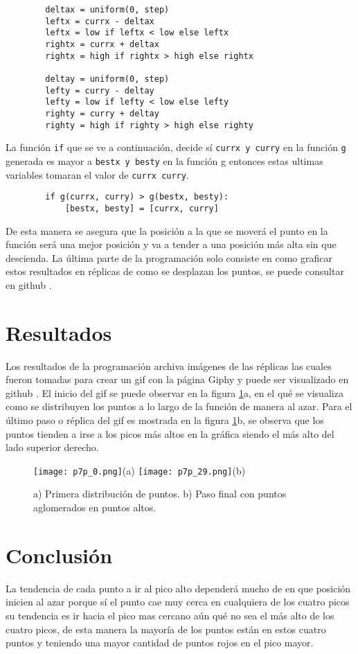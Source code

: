 \documentclass[a4paper, 11pt]{article}
\begin{document}
\begin{verbatim}
        deltax = uniform(0, step)
        leftx = currx - deltax  
        leftx = low if leftx < low else leftx  
        rightx = currx + deltax 
        rightx = high if rightx > high else rightx
        
        deltay = uniform(0, step)
        lefty = curry - deltay  
        lefty = low if lefty < low else lefty  
        righty = curry + deltay  
        righty = high if righty > high else righty 
\end{verbatim}

La función \texttt{if} que se ve a continuación, decide sí \texttt{currx y curry} en la función \texttt{g} generada es mayor a \texttt{bestx y besty} en la función g entonces estas ultimas variables tomaran el valor de \texttt{currx curry}.

\begin{verbatim}
        if g(currx, curry) > g(bestx, besty):
            [bestx, besty] = [currx, curry]
\end{verbatim}
De esta manera se asegura que la posición a la que se moverá el punto en la función será una mejor posición y va a tender a una posición más alta sin que descienda.
La última parte de la programación solo consiste en como graficar estos resultados en réplicas de como se desplazan los puntos, se puede consultar en github \cite{Edson}.

\section{Resultados}
Los resultados de la programación archiva imágenes de las réplicas las cuales fueron tomadas para crear un gif con la página Giphy \cite{GIPHY} y puede ser visualizado en github \cite{Edson}.
El inicio del gif se puede observar en la figura \ref{f5}a, en el qué se visualiza como se distribuyen los puntos a lo largo de la función de manera al azar. Para el último paso o réplica del gif es mostrada en la figura \ref{f5}b, se observa que los puntos tienden a irse a los picos más altos en la gráfica siendo el más alto del lado superior derecho.

\begin{figure}[H]
  \centering      
  \texttt{[image: p7p\_0.png]}(a)
  \texttt{[image: p7p\_29.png]}(b)
  \caption{a) Primera distribución de puntos. b) Paso final con puntos aglomerados en puntos altos.}
  \label{f5}
\end{figure}

\section{Conclusión}
La tendencia de cada punto a ir al pico alto dependerá mucho de en que posición inicien al azar porque sí el punto cae muy cerca en cualquiera de los cuatro picos su tendencia es ir hacia el pico mas cercano aún qué no sea el más alto de los cuatro picos, de esta manera la mayoría de los puntos están en estos cuatro puntos y teniendo una mayor cantidad de puntos rojos en el pico mayor.



\end{document}

